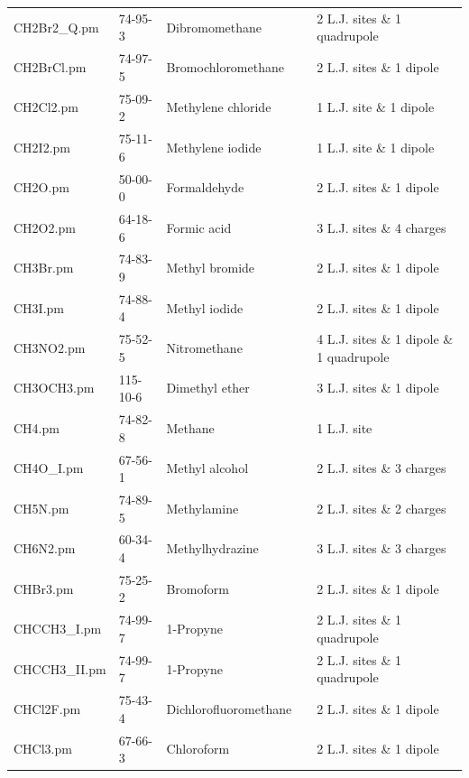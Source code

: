 \begin{landscape}
\begin{longtable}{lllll}
	CH2Br2\_Q.pm & 74-95-3 & Dibromomethane & \parencite{Stoll2003} & 2 L.J. sites \& 1 quadrupole \\
	CH2BrCl.pm & 74-97-5 & Bromochloromethane & \parencite{Stoll2003} & 2 L.J. sites \& 1 dipole \\
	CH2Cl2.pm & 75-09-2 & Methylene chloride & \parencite{Stoll2003} & 1 L.J. site \& 1 dipole \\
	CH2I2.pm & 75-11-6 & Methylene iodide & \parencite{Stoll2003} & 1 L.J. site \& 1 dipole \\
	CH2O.pm & 50-00-0 & Formaldehyde & \parencite{Eckl2008_C} & 2 L.J. sites \& 1 dipole \\
	CH2O2.pm & 64-18-6 & Formic acid & \parencite{Schnabel2007_B} & 3 L.J. sites \& 4 charges \\
	CH3Br.pm & 74-83-9 & Methyl bromide & \parencite{Stoll2003} & 2 L.J. sites \& 1 dipole \\
	CH3I.pm & 74-88-4 & Methyl iodide & \parencite{Stoll2003} & 2 L.J. sites \& 1 dipole \\
	CH3NO2.pm & 75-52-5 & Nitromethane & \parencite{Eckl2008_C} & 4 L.J. sites \& 1 dipole \& 1 quadrupole \\
	CH3OCH3.pm & 115-10-6 & Dimethyl ether & \parencite{Eckl2008_C} & 3 L.J. sites \& 1 dipole  \\
	CH4.pm & 74-82-8 & Methane & \parencite{Vrabec2001} & 1 L.J. site \\
	CH4O\_I.pm & 67-56-1 & Methyl alcohol & \parencite{Schnabel2007_A} & 2 L.J. sites \& 3 charges \\
	CH5N.pm & 74-89-5 & Methylamine & \parencite{Schnabel2008} & 2 L.J. sites \& 2 charges \\
	CH6N2.pm & 60-34-4 & Methylhydrazine & \parencite{Elts2012} & 3 L.J. sites \& 3 charges \\
	CHBr3.pm & 75-25-2 & Bromoform & \parencite{Stoll2003} & 2 L.J. sites \& 1 dipole \\
	CHCCH3\_I.pm & 74-99-7 & 1-Propyne & \parencite{Vrabec2001} & 2 L.J. sites \& 1 quadrupole \\
	CHCCH3\_II.pm & 74-99-7 & 1-Propyne & \parencite{Stoll2004} & 2 L.J. sites \& 1 quadrupole \\
	CHCl2F.pm & 75-43-4 & Dichlorofluoromethane & \parencite{Stoll2003} & 2 L.J. sites \& 1 dipole \\
	CHCl3.pm & 67-66-3 & Chloroform & \parencite{Stoll2003} & 2 L.J. sites \& 1 dipole \\

\end{longtable}
\end{landscape}
